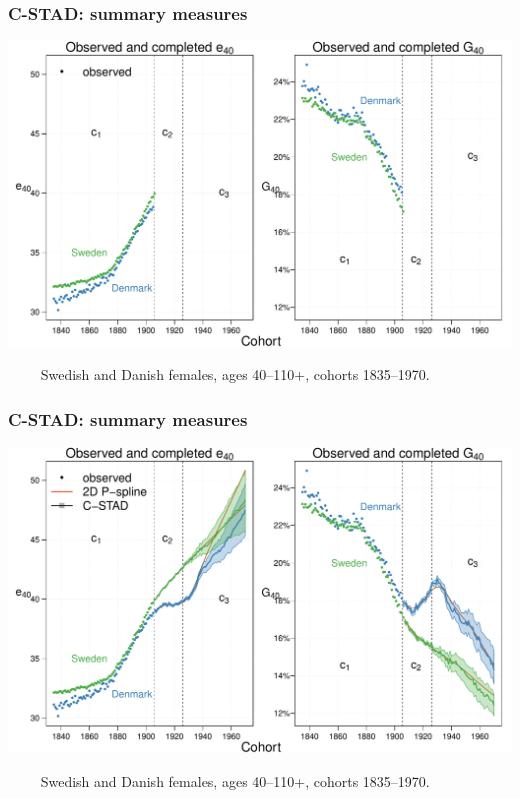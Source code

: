 \documentclass[12pt, xcolor=table]{beamer}  %
\begin{document}
\begin{frame}\frametitle{C-STAD: summary measures}
	
	\vspace{-0.5cm}
	
	\begin{center}	
		\vspace{0.4cm}
		
		\includegraphics[scale=.41]{Figures/Ch4/F6_1}
		
	\end{center}
		
\vspace{-0.15cm}
\tiny{$\quad\quad$ Swedish and Danish females, ages 40--110+, cohorts 1835--1970.}

\end{frame}

\begin{frame}[noframenumbering]\frametitle{C-STAD: summary measures}
	
\vspace{-0.5cm}

\begin{center}	
	\vspace{0.4cm}
	
	\includegraphics[scale=.41]{Figures/Ch4/F6_3}
	
\end{center}
	
\vspace{-0.15cm}
\tiny{$\quad\quad$ Swedish and Danish females, ages 40--110+, cohorts 1835--1970.}

	
\end{frame}
\end{document}
